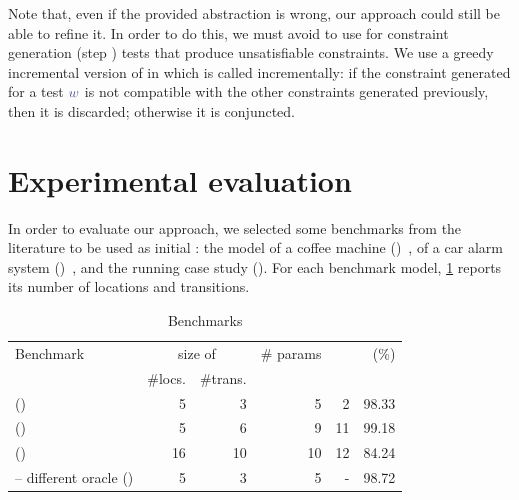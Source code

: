 \begin{tikzborder}{\cite{Gargantini16:validation}}
\begin{tikzborder}{\cite{gargantini_combinatorial_2017}}
\begin{tikzborder}{\cite{gargantini_combinatorial_2017}}
\begin{tikzborder}{\cite{garn2019}}
\begin{tikzborder}{\cite{arcaini2019achieving}}
\begin{tikzborder}{\cite{arcaini2019varivolution}}
\begin{tikzborder}{}
Note that, even if the provided abstraction is wrong, our approach could still be able to refine it. In order to do this, we must avoid to use for constraint generation (step ) tests that produce unsatisfiable constraints. We use a greedy incremental version of \genConstr in which \replayTW{} is called incrementally: if the constraint generated for a test $\word$ is not compatible with the other constraints generated previously, then it is discarded; otherwise it is conjuncted.
\end{tikzborder}

\section{Experimental evaluation}\label{sec:evaluation2}

\begin{tikzborder}{}
In order to evaluate our approach, we selected some benchmarks from the literature to be used as initial \ta \initTa: the model of a coffee machine (\benchmarkCoffeeShort)~\cite{aichernig2013time}, of a car alarm system (\benchmarkCarAlarmShort)~\cite{aichernig2013time}, and the running case study (\benchmarkExampleShort). For each benchmark model, \ref{table:benchmarks1} reports its number of locations and transitions.
\be

%
\begin{table}[!htb]
	\centering
	\caption{Benchmarks}
	\label{table:benchmarks1}
	\setlength\tabcolsep{4pt}
	\begin{tabular}{lrrrrr}
		\toprule
		Benchmark & \multicolumn{2}{c}{size of \initTa } & \# params & \syntDist & \semConf (\%)\\
		\cline{2-3}
		& \#locs. & \#trans.\\
		\midrule
		\benchmarkExample (\benchmarkExampleShort) & 5 & 3 & 5 & 2 & 98.33\\
		\hline
		\benchmarkCoffee (\benchmarkCoffeeShort) & 5 & 6 & 9 & 11 & 99.18\\
		\hline
		\benchmarkCarAlarm (\benchmarkCarAlarmShort) & 16 & 10 & 10 & 12 & 84.24\\
		\hline
		\hline
		\benchmarkExample{} -- different oracle (\benchmarkExampleShortAlt) & 5 & 3 & 5 & - & 98.72\\
		\bottomrule
	\end{tabular}
\end{table}


\end{tikzborder}
\end{tikzborder}
\end{tikzborder}
\end{tikzborder}
\end{tikzborder}
\end{tikzborder}
\end{tikzborder}
